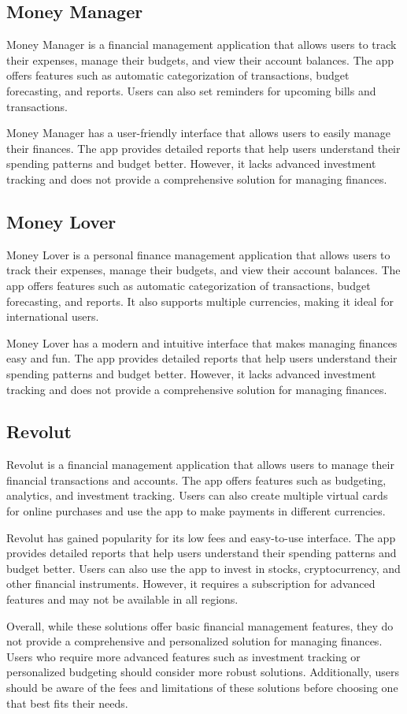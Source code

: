 \subsection{Money Manager}
Money Manager is a financial management application that allows users to track their expenses, manage their budgets, and view their account balances. The app offers features such as automatic categorization of transactions, budget forecasting, and reports. Users can also set reminders for upcoming bills and transactions.

Money Manager has a user-friendly interface that allows users to easily manage their finances. The app provides detailed reports that help users understand their spending patterns and budget better. However, it lacks advanced investment tracking and does not provide a comprehensive solution for managing finances.

\subsection{Money Lover}
Money Lover is a personal finance management application that allows users to track their expenses, manage their budgets, and view their account balances. The app offers features such as automatic categorization of transactions, budget forecasting, and reports. It also supports multiple currencies, making it ideal for international users.

Money Lover has a modern and intuitive interface that makes managing finances easy and fun. The app provides detailed reports that help users understand their spending patterns and budget better. However, it lacks advanced investment tracking and does not provide a comprehensive solution for managing finances.

\subsection{Revolut}
Revolut is a financial management application that allows users to manage their financial transactions and accounts. The app offers features such as budgeting, analytics, and investment tracking. Users can also create multiple virtual cards for online purchases and use the app to make payments in different currencies.

Revolut has gained popularity for its low fees and easy-to-use interface. The app provides detailed reports that help users understand their spending patterns and budget better. Users can also use the app to invest in stocks, cryptocurrency, and other financial instruments. However, it requires a subscription for advanced features and may not be available in all regions.

Overall, while these solutions offer basic financial management features, they do not provide a comprehensive and personalized solution for managing finances. Users who require more advanced features such as investment tracking or personalized budgeting should consider more robust solutions. Additionally, users should be aware of the fees and limitations of these solutions before choosing one that best fits their needs.
